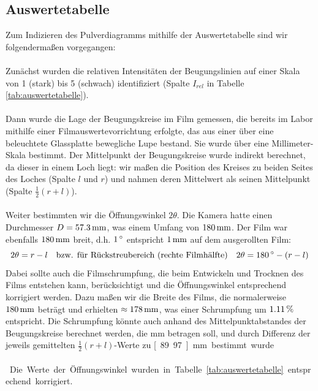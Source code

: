 \documentclass[a4paper,titlepage]{scrartcl}
\numberwithin{equation}{section}
\begin{document}
\subsection{Auswertetabelle}
Zum Indizieren des Pulverdiagramms mithilfe der Auswertetabelle sind wir folgendermaßen vorgegangen:\\ \\
Zunächst wurden die relativen Intensitäten der Beugungslinien auf einer Skala von 1 (stark) bis 5 (schwach) identifiziert (Spalte $I_{rel}$ in Tabelle \ref{tab:auswertetabelle}).\\ \\
Dann wurde die Lage der Beugungskreise im Film gemessen, die bereits im Labor mithilfe einer Filmauswertevorrichtung erfolgte, das aus einer über eine beleuchtete Glassplatte bewegliche Lupe bestand. Sie wurde über eine Millimeter-Skala bestimmt. Der Mittelpunkt der Beugungskreise wurde indirekt berechnet, da dieser in einem Loch liegt: wir maßen die Position des Kreises zu beiden Seites des Loches (Spalte $l$ und $r$) und nahmen deren Mittelwert als seinen Mittelpunkt (Spalte $\frac{1}{2}(r+l)$).\\ \\
Weiter bestimmten wir die Öffnungswinkel $2 \theta$. Die Kamera hatte einen Durchmesser $D=\unit[57.3]{mm}$, was einem Umfang von $\unit[180]{mm}$. Der Film war ebenfalls $\unit[180]{mm}$ breit, d.h. $\unit[1]{^{\circ}}$ entspricht $\unit[1]{mm}$ auf dem ausgerollten Film:
\begin{equation}
2\theta=r-l \quad \text{bzw. für Rückstreubereich (rechte Filmhälfte)} \quad 2 \theta=\unit[180]{^\circ} - (r-l)
\end{equation}
Dabei sollte auch die Filmschrumpfung, die beim Entwickeln und Trocknen des Films entstehen kann, berücksichtigt und die Öffnungswinkel entsprechend korrigiert werden. Dazu maßen wir die Breite des Films, die normalerweise $\unit[180]{mm}$ beträgt und erhielten $\approx \unit[178]{mm}$, was einer Schrumpfung um $\unit[1.11]{\%}$ entspricht. Die Schrumpfung könnte auch anhand des Mittelpunktabstandes der Beugungskreise berechnet werden, die \unit[90]{mm} betragen soll, und durch Differenz der jeweils gemittelten $\frac{1}{2}(r+l)$-Werte zu \unit[89.97]{mm} bestimmt wurde.\\ \\
Die Werte der Öffnungswinkel wurden in Tabelle \ref{tab:auswertetabelle} entsprechend korrigiert.
\end{document}
